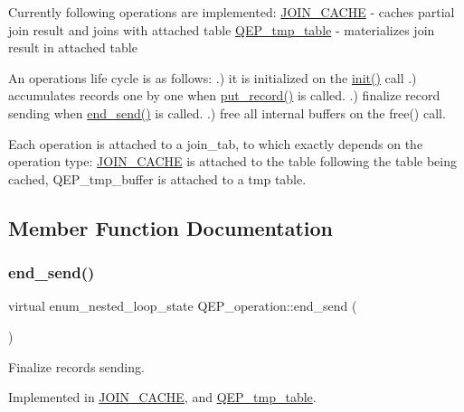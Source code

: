 Currently following operations are implemented\+: \mbox{\hyperlink{classJOIN__CACHE}{J\+O\+I\+N\+\_\+\+C\+A\+C\+HE}} -\/ caches partial join result and joins with attached table \mbox{\hyperlink{classQEP__tmp__table}{Q\+E\+P\+\_\+tmp\+\_\+table}} -\/ materializes join result in attached table

An operation\textquotesingle{}s life cycle is as follows\+: .) it is initialized on the \mbox{\hyperlink{classQEP__operation_a27930ae9c3ab63a046135704707190fa}{init()}} call .) accumulates records one by one when \mbox{\hyperlink{classQEP__operation_af7cac289b2b1a38349cc27e8a4ff7597}{put\+\_\+record()}} is called. .) finalize record sending when \mbox{\hyperlink{classQEP__operation_a4faf706cddaf3ae613fe92434776df5e}{end\+\_\+send()}} is called. .) free all internal buffers on the free() call.

Each operation is attached to a join\+\_\+tab, to which exactly depends on the operation type\+: \mbox{\hyperlink{classJOIN__CACHE}{J\+O\+I\+N\+\_\+\+C\+A\+C\+HE}} is attached to the table following the table being cached, Q\+E\+P\+\_\+tmp\+\_\+buffer is attached to a tmp table. 

\subsection{Member Function Documentation}
\mbox{\label{classQEP__operation_a4faf706cddaf3ae613fe92434776df5e}} 
\subsubsection{\texorpdfstring{end\+\_\+send()}{end\_send()}}
{\footnotesize\ttfamily virtual enum\+\_\+nested\+\_\+loop\+\_\+state Q\+E\+P\+\_\+operation\+::end\+\_\+send (\begin{DoxyParamCaption}{ }\end{DoxyParamCaption})\hspace{0.3cm}{\ttfamily [pure virtual]}}

Finalize records sending. 

Implemented in \mbox{\hyperlink{classJOIN__CACHE_a1c3046624063d752fe21c895e13a00c9}{J\+O\+I\+N\+\_\+\+C\+A\+C\+HE}}, and \mbox{\hyperlink{group__Query__Executor_ga1cbaa4a44140f41c161eaab87c25f473}{Q\+E\+P\+\_\+tmp\+\_\+table}}.

